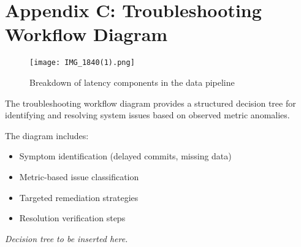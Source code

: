 \documentclass[12pt]{article}
\begin{document}
\section{Appendix C: Troubleshooting Workflow Diagram}
\label{app:troubleshooting}

\begin{figure}[H]
    \centering
    \texttt{[image: IMG\_1840(1).png]} %
    \caption{Breakdown of latency components in the data pipeline}
    \label{fig:latency-pipeline}
\end{figure}

The troubleshooting workflow diagram provides a structured decision tree for identifying and resolving system issues based on observed metric anomalies.

The diagram includes:
\begin{itemize}
    \item Symptom identification (delayed commits, missing data)
    \item Metric-based issue classification
    \item Targeted remediation strategies
    \item Resolution verification steps
\end{itemize}

\textit{Decision tree to be inserted here.}
\end{document}
